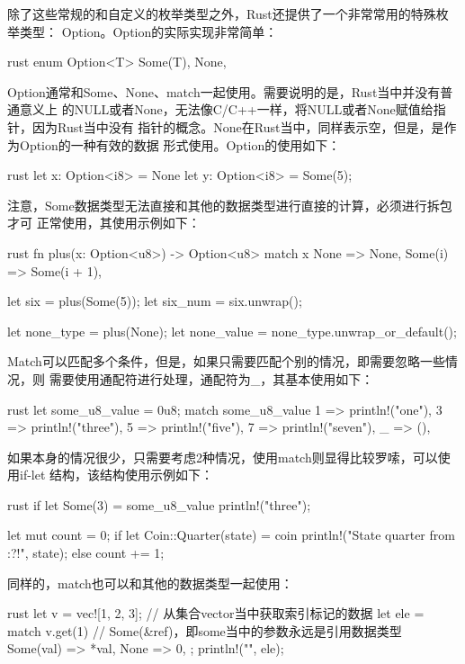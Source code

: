除了这些常规的和自定义的枚举类型之外，Rust还提供了一个非常常用的特殊枚举类型：
Option。Option的实际实现非常简单：
\begin{code-block}{rust}
enum Option<T> {
    Some(T),
    None,
}
\end{code-block}
Option通常和Some、None、match一起使用。需要说明的是，Rust当中并没有普通意义上
的NULL或者None，无法像C/C++一样，将NULL或者None赋值给指针，因为Rust当中没有
指针的概念。None在Rust当中，同样表示空，但是，是作为Option的一种有效的数据
形式使用。Option的使用如下：
\begin{code-block}{rust}
let x: Option<i8> = None
let y: Option<i8> = Some(5);
\end{code-block}
注意，Some数据类型无法直接和其他的数据类型进行直接的计算，必须进行拆包才可
正常使用，其使用示例如下：
\begin{code-block}{rust}
fn plus(x: Option<u8>) -> Option<u8> {
    match x {
       None => None,
       Some(i) => Some(i + 1),
    }
}

let six = plus(Some(5));
let six_num = six.unwrap();

let none_type = plus(None);
let none_value = none_type.unwrap_or_default();
\end{code-block}

Match可以匹配多个条件，但是，如果只需要匹配个别的情况，即需要忽略一些情况，则
需要使用通配符进行处理，通配符为\_，其基本使用如下：
\begin{code-block}{rust}
let some_u8_value = 0u8;
match some_u8_value {
    1 => println!("one"),
    3 => println!("three"),
    5 => println!("five"),
    7 => println!("seven"),
    _ => (),
}
\end{code-block}
如果本身的情况很少，只需要考虑2种情况，使用match则显得比较罗嗦，可以使用if-let
结构，该结构使用示例如下：
\begin{code-block}{rust}
if let Some(3) = some_u8_value {
    println!("three");
}

let mut count = 0;
if let Coin::Quarter(state) = coin {
    println!("State quarter from {:?}!", state);
} else {
    count += 1;
}
\end{code-block}

同样的，match也可以和其他的数据类型一起使用：
\begin{code-block}{rust}
let v = vec![1, 2, 3];
// 从集合vector当中获取索引标记的数据
let ele = match v.get(1) {
    // Some(&ref)，即some当中的参数永远是引用数据类型
    Some(val) => *val,
    None => 0,
};
println!("{}", ele);
\end{code-block}

